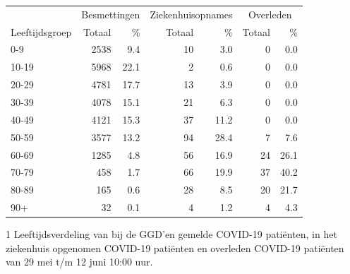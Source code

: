 \documentclass[
  english,
  man,floatsintext]{apa6}
\begin{document}
\begin{table}
\centering\begingroup\fontsize{11}{13}\selectfont

\begin{threeparttable}
\begin{tabular}{lrrrrrr}
\toprule
\multicolumn{1}{c}{ } & \multicolumn{2}{c}{Besmettingen} & \multicolumn{2}{c}{Ziekenhuisopnames} & \multicolumn{2}{c}{Overleden} \\
\cmidrule(l{3pt}r{3pt}){2-3} \cmidrule(l{3pt}r{3pt}){4-5} \cmidrule(l{3pt}r{3pt}){6-7}
Leeftijdsgroep & Totaal & \% & Totaal & \% & Totaal & \%\\
\midrule
0-9 & 2538 & 9.4 & 10 & 3.0 & 0 & 0.0\\
10-19 & 5968 & 22.1 & 2 & 0.6 & 0 & 0.0\\
20-29 & 4781 & 17.7 & 13 & 3.9 & 0 & 0.0\\
30-39 & 4078 & 15.1 & 21 & 6.3 & 0 & 0.0\\
40-49 & 4121 & 15.3 & 37 & 11.2 & 0 & 0.0\\
50-59 & 3577 & 13.2 & 94 & 28.4 & 7 & 7.6\\
60-69 & 1285 & 4.8 & 56 & 16.9 & 24 & 26.1\\
70-79 & 458 & 1.7 & 66 & 19.9 & 37 & 40.2\\
80-89 & 165 & 0.6 & 28 & 8.5 & 20 & 21.7\\
90+ & 32 & 0.1 & 4 & 1.2 & 4 & 4.3\\
\bottomrule
\end{tabular}
\begin{tablenotes}
\item[1] Leeftijdsverdeling van bij de GGD’en gemelde COVID-19 patiënten, in het ziekenhuis opgenomen COVID-19 patiënten en overleden COVID-19 patiënten van 29 mei t/m 12 juni 10:00 uur.
\end{tablenotes}
\end{threeparttable}
\endgroup{}
\end{table}

\newpage
\end{document}

